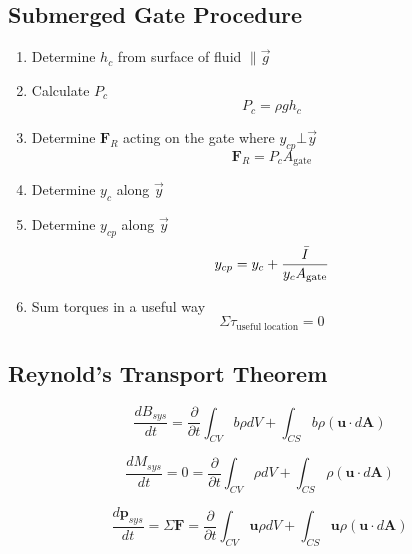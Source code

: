 \documentclass[twocolumn, 12pt]{article}
\begin{document}
{\subsection*{Submerged Gate Procedure}
\begin{enumerate}
    \item Determine \(h_c\) from surface of fluid \(\parallel  \vec{g}\)
    \item Calculate \(P_c\)
        \begin{equation*}
            P_c = \rho g h_c
        \end{equation*}
    \item Determine \(\textbf{F}_R\) acting on the gate where \(y_{cp} \bot \vec{y}\)
        \begin{equation*}
            \textbf{F}_R = P_cA_{\text{gate}}
        \end{equation*}
        \item Determine \(y_c\) along \(\vec{y}\)
        \item Determine \(y_{cp}\) along \(\vec{y}\)
            \begin{equation*}
                y_{cp} = y_c + \frac{\Bar{I}}{y_cA_{\text{gate}}}
            \end{equation*}
        \item Sum torques in a useful way
            \begin{equation*}
                \Sigma \tau_{\text{useful location}} =0
            \end{equation*}
\end{enumerate}


\subsection*{Reynold's Transport Theorem}
\begin{equation*}
    \frac{dB_{sys}}{dt} = \frac{\partial}{\partial t} \int_{CV} b\rho dV + \int_{CS}b\rho (\textbf{u}\cdot d\textbf{A})
\end{equation*}


\begin{equation*}
    \frac{dM_{sys}}{dt} =0= \frac{\partial}{\partial t} \int_{CV} \rho dV + \int_{CS}\rho (\textbf{u}\cdot d\textbf{A})
\end{equation*}


\begin{equation*}
    \frac{d\textbf{p}_{sys}}{dt} = \Sigma \textbf{F} =\frac{\partial}{\partial t} \int_{CV} \textbf{u}\rho dV + \int_{CS}\textbf{u}\rho (\textbf{u}\cdot d\textbf{A})
\end{equation*}


}
\end{document}
